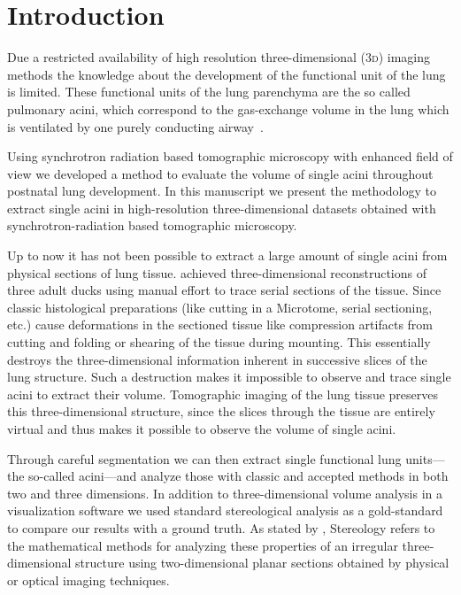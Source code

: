 \documentclass[%
	paper=a4,%
	abstract=true,%
	]{scrartcl}
\newcommand{\threed}{3\textsc{d}\xspace}
\begin{document}
\clearpage
{}
\tableofcontents

\clearpage
\section{Introduction}\label{sec:Introduction}
Due a restricted availability of high resolution three-dimensional (\threed) imaging methods the knowledge about the development of the functional unit of the lung is limited. These functional units of the lung parenchyma are the so called pulmonary acini, which correspond to the gas-exchange volume in the lung which is ventilated by one purely conducting airway~\cite{Rodriguez1987}.

Using synchrotron radiation based tomographic microscopy with enhanced field of view \cite{Haberthuer2010a} we developed a method to evaluate the volume of single acini throughout postnatal lung development. In this manuscript we present the methodology to extract single acini in high-resolution three-dimensional datasets obtained with synchrotron-radiation based tomographic microscopy.

Up to now it has not been possible to extract a large amount of single acini from physical sections of lung tissue. \citet{Woodward2005} achieved three-dimensional reconstructions of three adult ducks using manual effort to trace serial sections of the tissue. Since classic histological preparations (like cutting in a Microtome, serial sectioning, etc.) cause deformations in the sectioned tissue like compression artifacts from cutting and folding or shearing of the tissue during mounting. This essentially destroys the three-dimensional information inherent in successive slices of the lung structure. Such a destruction makes it impossible to observe and trace single acini to extract their volume. Tomographic imaging of the lung tissue preserves this three-dimensional structure, since the slices through the tissue are entirely virtual and thus makes it possible to observe the volume of single acini.

Through careful segmentation we can then extract single functional lung units---the so-called acini---and analyze those with classic and accepted methods in both two and three dimensions. In addition to three-dimensional volume analysis in a visualization software we used standard stereological analysis \cite{Hsia2010} as a gold-standard to compare our results with a ground truth. As stated by \citet{Hsia2010}, Stereology refers to the mathematical methods for analyzing these properties of an irregular three-dimensional structure using two-dimensional planar sections obtained by physical or optical imaging techniques.
\end{document}
